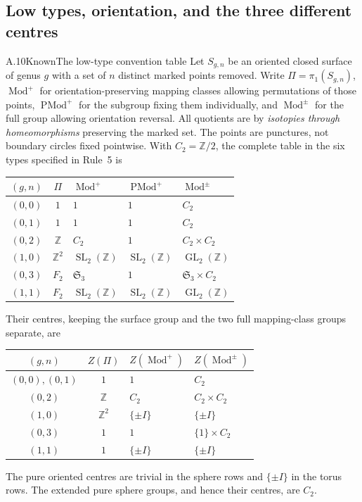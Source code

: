 \subsection{Low types, orientation, and the three different centres}

\begin{statement}{A.10}{Known}{The low-type convention table}
Let \(S_{g,n}\) be an oriented closed surface of genus \(g\)
with a set of \(n\) distinct marked points removed.
Write \(\Pi=\pi_1(S_{g,n})\), \(\operatorname{Mod}^{+}\)
for orientation-preserving mapping classes allowing permutations
of those points, \(\operatorname{PMod}^{+}\) for the subgroup
fixing them individually, and \(\operatorname{Mod}^{\pm}\)
for the full group allowing orientation reversal.
All quotients are by \emph{isotopies through homeomorphisms}
preserving the marked set.  The points are punctures, not
boundary circles fixed pointwise.  With \(C_2=\mathbb Z/2\),
the complete table in the six types specified in Rule~5 is
\begin{center}\small
\begin{tabular}{@{}cclll@{}}
\toprule
\((g,n)\)&\(\Pi\)&\(\operatorname{Mod}^{+}\)&
\(\operatorname{PMod}^{+}\)&\(\operatorname{Mod}^{\pm}\)\\
\midrule
\((0,0)\)&\(1\)&\(1\)&\(1\)&\(C_2\)\\
\((0,1)\)&\(1\)&\(1\)&\(1\)&\(C_2\)\\
\((0,2)\)&\(\mathbb Z\)&\(C_2\)&\(1\)&\(C_2\times C_2\)\\
\((1,0)\)&\(\mathbb Z^2\)&\(\operatorname{SL}_2(\mathbb Z)\)&
\(\operatorname{SL}_2(\mathbb Z)\)&\(\operatorname{GL}_2(\mathbb Z)\)\\
\((0,3)\)&\(F_2\)&\(\mathfrak S_3\)&\(1\)&
\(\mathfrak S_3\times C_2\)\\
\((1,1)\)&\(F_2\)&\(\operatorname{SL}_2(\mathbb Z)\)&
\(\operatorname{SL}_2(\mathbb Z)\)&\(\operatorname{GL}_2(\mathbb Z)\)\\
\bottomrule
\end{tabular}
\end{center}
Their centres, keeping the surface group and the two full
mapping-class groups separate, are
\begin{center}\small
\begin{tabular}{@{}ccll@{}}
\toprule
\((g,n)\)&\(Z(\Pi)\)&\(Z(\operatorname{Mod}^{+})\)&
\(Z(\operatorname{Mod}^{\pm})\)\\
\midrule
\((0,0),(0,1)\)&\(1\)&\(1\)&\(C_2\)\\
\((0,2)\)&\(\mathbb Z\)&\(C_2\)&\(C_2\times C_2\)\\
\((1,0)\)&\(\mathbb Z^2\)&\(\{\pm I\}\)&\(\{\pm I\}\)\\
\((0,3)\)&\(1\)&\(1\)&\(\{1\}\times C_2\)\\
\((1,1)\)&\(1\)&\(\{\pm I\}\)&\(\{\pm I\}\)\\
\bottomrule
\end{tabular}
\end{center}
The pure oriented centres are trivial in the sphere rows and
\(\{\pm I\}\) in the torus rows.  The extended pure sphere
groups, and hence their centres, are \(C_2\).
\end{statement}

